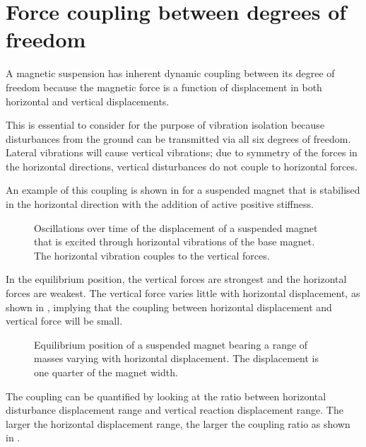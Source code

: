 \section{Force coupling between degrees of freedom}

A magnetic suspension has inherent dynamic coupling between its degree of
freedom because the magnetic force is a function of displacement in both
horizontal and vertical displacements.

This is essential to consider for the purpose of vibration isolation because
disturbances from the ground can be transmitted via all six degrees of
freedom. Lateral vibrations will cause vertical vibrations; due to symmetry of
the forces in the horizontal directions, vertical disturbances do not couple
to horizontal forces.

An example of this coupling is shown in  for a
suspended magnet that is stabilised in the horizontal direction with the
addition of active positive stiffness. 

\begin{figure}
  \caption{Oscillations over time of the displacement of a suspended magnet that is excited through horizontal vibrations of the base magnet. The horizontal vibration couples to the vertical forces.}
\end{figure}

In the equilibrium position, the vertical forces are strongest and the
horizontal forces are weakest. The vertical force varies little with
horizontal displacement, as shown in , implying
that the coupling between horizontal displacement and vertical force will be
small.

\begin{figure}
  \caption{Equilibrium position of a suspended magnet bearing a range of 
  masses varying with horizontal displacement. 
  The displacement is one quarter of the magnet width.}
\end{figure}

The coupling can be quantified by looking at the ratio between horizontal
disturbance displacement range and vertical reaction displacement range. The
larger the horizontal displacement range, the larger the coupling ratio as
shown in .

